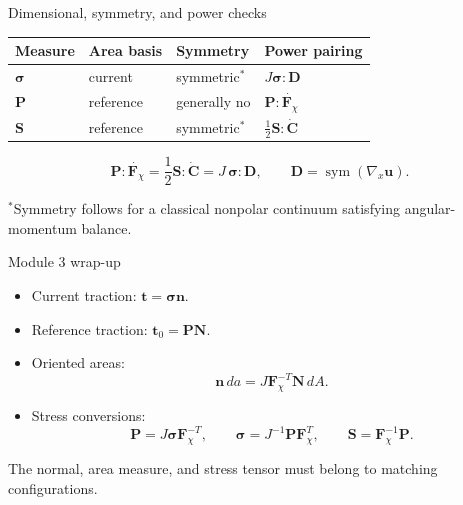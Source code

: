 \documentclass[aspectratio=169,11pt]{beamer}
\newcommand{\uEuler}{\bm{u}}
\newcommand{\Fdef}{\bm{F}_{\chi}}
\newcommand{\Cten}{\bm{C}}
\newcommand{\sigmaC}{\bm{\sigma}}
\newcommand{\Pten}{\bm{P}}
\newcommand{\Sten}{\bm{S}}
\newcommand{\Nvec}{\bm{N}}
\newcommand{\nvec}{\bm{n}}
\newcommand{\tvec}{\bm{t}}
\newcommand{\gradx}{\nabla_{\!x}}
\begin{document}
\begin{frame}{Dimensional, symmetry, and power checks}
\small
\begin{center}
\renewcommand{\arraystretch}{1.18}
\begin{tabular}{llll}
\toprule
Measure & Area basis & Symmetry & Power pairing \\
\midrule
\(\sigmaC\) & current & symmetric$^\ast$ & \(J\sigmaC:\bm{D}\) \\
\(\Pten\) & reference & generally no & \(\Pten:\dot{\Fdef}\) \\
\(\Sten\) & reference & symmetric$^\ast$ & \(\tfrac12\Sten:\dot{\Cten}\) \\
\bottomrule
\end{tabular}
\end{center}
\[
  \Pten:\dot{\Fdef}
  =
  \frac12\Sten:\dot{\Cten}
  =
  J\,\sigmaC:\bm{D},
\qquad
  \bm{D}=\operatorname{sym}(\gradx\uEuler).
\]
\begin{punchbox}
\small
\({}^\ast\)Symmetry follows for a classical nonpolar continuum satisfying angular-momentum balance.
\end{punchbox}
\end{frame}

\begin{frame}{Module 3 wrap-up}
\begin{itemize}\itemsep6pt
  \item Current traction: \(\tvec=\sigmaC\nvec\).
  \item Reference traction: \(\bm{t}_0=\Pten\Nvec\).
  \item Oriented areas:
  \[
    \nvec\,da=J\Fdef^{-T}\Nvec\,dA.
  \]
  \item Stress conversions:
  \[
    \Pten=J\sigmaC\Fdef^{-T},
    \qquad
    \sigmaC=J^{-1}\Pten\Fdef^T,
    \qquad
    \Sten=\Fdef^{-1}\Pten.
  \]
\end{itemize}
\medskip
\begin{punchbox}
\small
The normal, area measure, and stress tensor must belong to matching configurations.
\end{punchbox}
\end{frame}
\end{document}
